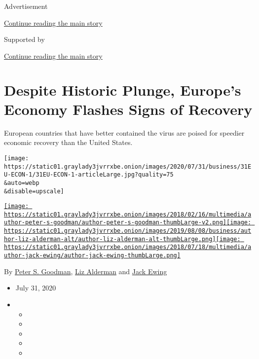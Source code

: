 Advertisement

\protect\hyperlink{after-top}{Continue reading the main story}

Supported by

\protect\hyperlink{after-sponsor}{Continue reading the main story}

\hypertarget{despite-historic-plunge-europes-economy-flashes-signs-of-recovery}{%
\section{Despite Historic Plunge, Europe's Economy Flashes Signs of
Recovery}\label{despite-historic-plunge-europes-economy-flashes-signs-of-recovery}}

European countries that have better contained the virus are poised for
speedier economic recovery than the United States.

\texttt{[image: https://static01.graylady3jvrrxbe.onion/images/2020/07/31/business/31EU-ECON-1/31EU-ECON-1-articleLarge.jpg?quality=75\\\&auto=webp\\\&disable=upscale]}

\href{https://www.nytimes3xbfgragh.onion/by/peter-s-goodman}{\texttt{[image: https://static01.graylady3jvrrxbe.onion/images/2018/02/16/multimedia/author-peter-s-goodman/author-peter-s-goodman-thumbLarge-v2.png]}}\href{https://www.nytimes3xbfgragh.onion/by/liz-alderman}{\texttt{[image: https://static01.graylady3jvrrxbe.onion/images/2019/08/08/business/author-liz-alderman-alt/author-liz-alderman-alt-thumbLarge.png]}}\href{https://www.nytimes3xbfgragh.onion/by/jack-ewing}{\texttt{[image: https://static01.graylady3jvrrxbe.onion/images/2018/07/18/multimedia/author-jack-ewing/author-jack-ewing-thumbLarge.png]}}

By \href{https://www.nytimes3xbfgragh.onion/by/peter-s-goodman}{Peter S.
Goodman}, \href{https://www.nytimes3xbfgragh.onion/by/liz-alderman}{Liz
Alderman} and
\href{https://www.nytimes3xbfgragh.onion/by/jack-ewing}{Jack Ewing}

\begin{itemize}
\item
  July 31, 2020
\item
  \begin{itemize}
  \item
  \item
  \item
  \item
  \item
  \end{itemize}
\end{itemize}

